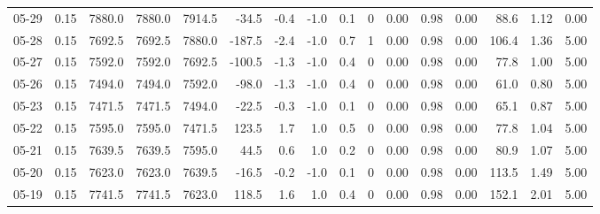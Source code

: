 \begin{threeparttable}
{\begin{tabular}{lrrrrrrrrrrrrrrr}
  05-29 &     0.15 & 7880.0 & 7880.0 & 7914.5 &      -34.5 &           -0.4 &                     -1.0 &                 0.1 &              0 &       0.00 &      0.98 &           0.00 &             88.6 &            1.12 &                   0.00 \\
  05-28 &     0.15 & 7692.5 & 7692.5 & 7880.0 &     -187.5 &           -2.4 &                     -1.0 &                 0.7 &              1 &       0.00 &      0.98 &           0.00 &            106.4 &            1.36 &                   5.00 \\
  05-27 &     0.15 & 7592.0 & 7592.0 & 7692.5 &     -100.5 &           -1.3 &                     -1.0 &                 0.4 &              0 &       0.00 &      0.98 &           0.00 &             77.8 &            1.00 &                   5.00 \\
  05-26 &     0.15 & 7494.0 & 7494.0 & 7592.0 &      -98.0 &           -1.3 &                     -1.0 &                 0.4 &              0 &       0.00 &      0.98 &           0.00 &             61.0 &            0.80 &                   5.00 \\
  05-23 &     0.15 & 7471.5 & 7471.5 & 7494.0 &      -22.5 &           -0.3 &                     -1.0 &                 0.1 &              0 &       0.00 &      0.98 &           0.00 &             65.1 &            0.87 &                   5.00 \\
  05-22 &     0.15 & 7595.0 & 7595.0 & 7471.5 &      123.5 &            1.7 &                      1.0 &                 0.5 &              0 &       0.00 &      0.98 &           0.00 &             77.8 &            1.04 &                   5.00 \\
  05-21 &     0.15 & 7639.5 & 7639.5 & 7595.0 &       44.5 &            0.6 &                      1.0 &                 0.2 &              0 &       0.00 &      0.98 &           0.00 &             80.9 &            1.07 &                   5.00 \\
  05-20 &     0.15 & 7623.0 & 7623.0 & 7639.5 &      -16.5 &           -0.2 &                     -1.0 &                 0.1 &              0 &       0.00 &      0.98 &           0.00 &            113.5 &            1.49 &                   5.00 \\
  05-19 &     0.15 & 7741.5 & 7741.5 & 7623.0 &      118.5 &            1.6 &                      1.0 &                 0.4 &              0 &       0.00 &      0.98 &           0.00 &            152.1 &            2.01 &                   5.00 \\

\end{tabular}}
\end{threeparttable}
